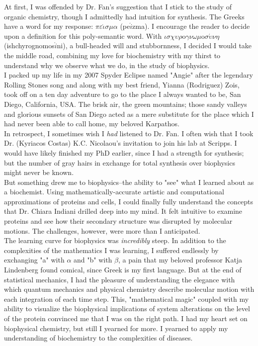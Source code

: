 \documentclass[12pt]{ucsddissertation}
\newcommand\tab[1][1cm]{\hspace*{#1}}
\begin{document}
\begin{preface}
At first, I was offended by Dr. Fan's suggestion that I stick to the study of organic chemistry, though I admittedly had intuition for synthesis. The Greeks have a word for my response: $\pi\varepsilon\acute{\iota}\sigma\mu\alpha$ (pe$\acute{i}$zma). I encourage the reader to decide upon a definition for this poly-semantic word. With $\iota\sigma\chi\upsilon\rho$o$\gamma\nu\omega\mu$o$\sigma\acute{\upsilon}\nu\eta$ (ishchyrognomos$\acute{i}$ni), a bull-headed will and stubbornness, I decided I would take the middle road, combining my love for biochemistry with my thirst to understand why we observe what we do, in the study of biophysics.\\
\tab[0.7cm]I packed up my life in my 2007 Spyder Eclipse named "Angie" after the legendary Rolling Stones song and along with my best friend, Yianna (Rodriguez) Zois, took off on a ten day adventure to go to the place I always wanted to be, San Diego, California, USA. The brisk air, the green mountains; those sandy valleys and glorious sunsets of San Diego acted as a mere substitute for the place which I had never been able to call home, my beloved Karpathos.\\
\tab[0.7cm]In retrospect, I  sometimes wish I \textit{had} listened to Dr. Fan. I often wish that I took Dr. (Kyriacos Costas) K.C. Nicolaou's invitation to join his lab at Scripps. I would have likely finished my PhD earlier, since I had a strength for synthesis; but the number of gray hairs in exchange for total synthesis over biophysics might never be known. \\
\tab[0.7cm] But something drew me to biophysics--the ability to "see" what I learned about as a biochemist. Using mathematically-accurate artistic and computational approximations of proteins and cells, I could finally fully understand the concepts that Dr. Chiara Indiani drilled deep into my mind. It felt intuitive to examine proteins and see how their secondary structure was disrupted by molecular motions. The challenges, however, were more than I anticipated.\\
\tab[0.7cm]The learning curve for biophysics was \textit{incredibly} steep. In addition to the complexities of the mathematics I was learning, I suffered endlessly by exchanging "a" with $\alpha$ and "b" with $\beta$, a pain that my beloved professor Katja Lindenberg found comical, since Greek is my first language. But at the end of statistical mechanics, I had the pleasure of understanding the elegance with which quantum mechanics and physical chemistry describe molecular motion with each integration of each time step. This, "mathematical magic" coupled with my ability to visualize the biophysical implications of system alterations on the level of the protein convinced me that I was on the right path.  I had my heart set on biophysical chemistry, but still I yearned for more. I yearned to apply my understanding of biochemistry to the complexities of diseases.\\

\end{preface}
\end{document}
